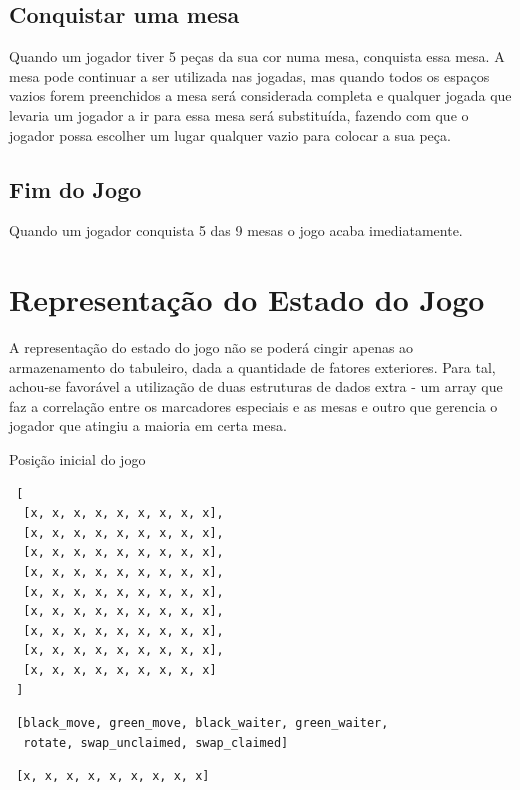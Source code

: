 \documentclass[a4paper]{article}
\begin{document}
\subsection{Conquistar uma mesa}
Quando um jogador tiver 5 peças da sua cor numa mesa, conquista essa mesa. A mesa pode continuar a ser utilizada nas jogadas, mas quando todos os espaços vazios forem preenchidos a mesa será considerada completa e qualquer jogada que levaria um jogador a ir para essa mesa será substituída, fazendo com que o jogador possa escolher um lugar qualquer vazio para colocar a sua peça.

\subsection{Fim do Jogo}
Quando um jogador conquista 5 das 9 mesas o jogo acaba imediatamente.

\section{Representação do Estado do Jogo}

A representação do estado do jogo não se poderá cingir apenas ao armazenamento do tabuleiro, dada a quantidade de fatores exteriores. \newline
Para tal, achou-se favorável a utilização de duas estruturas de dados extra - um array que faz a correlação entre os marcadores especiais e as mesas e outro que gerencia o jogador que atingiu a maioria em certa mesa. \newline \newline

Posição inicial do jogo
\begin{lstlisting}
 [
  [x, x, x, x, x, x, x, x, x],
  [x, x, x, x, x, x, x, x, x],
  [x, x, x, x, x, x, x, x, x],
  [x, x, x, x, x, x, x, x, x],
  [x, x, x, x, x, x, x, x, x],
  [x, x, x, x, x, x, x, x, x],
  [x, x, x, x, x, x, x, x, x],
  [x, x, x, x, x, x, x, x, x],
  [x, x, x, x, x, x, x, x, x]
 ]
\end{lstlisting}

\begin{lstlisting}
 [black_move, green_move, black_waiter, green_waiter, 
  rotate, swap_unclaimed, swap_claimed]
\end{lstlisting}

\begin{lstlisting}
 [x, x, x, x, x, x, x, x, x]
\end{lstlisting}
\end{document}
